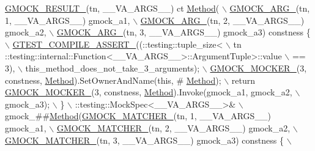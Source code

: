\begin{DoxyCode}
\hyperlink{gmock-generated-function-mockers_8h_a0e9d94e9c77df84f1103af06feee1077}{GMOCK\_RESULT\_}(tn, \_\_VA\_ARGS\_\_) ct \hyperlink{gmock-spec-builders__test_8cc_a95606368148f3e5aab5db46c32466afd}{Method}( \(\backslash\)
      \hyperlink{gmock-generated-function-mockers_8h_a887575cc1c31158fba808180a10c004f}{GMOCK\_ARG\_}(tn, 1, \_\_VA\_ARGS\_\_) gmock\_a1, \(\backslash\)
      \hyperlink{gmock-generated-function-mockers_8h_a887575cc1c31158fba808180a10c004f}{GMOCK\_ARG\_}(tn, 2, \_\_VA\_ARGS\_\_) gmock\_a2, \(\backslash\)
      \hyperlink{gmock-generated-function-mockers_8h_a887575cc1c31158fba808180a10c004f}{GMOCK\_ARG\_}(tn, 3, \_\_VA\_ARGS\_\_) gmock\_a3) constness \{ \hyperlink{gtest-port_8h_ae1f37dc71d5daa6fb49ca1b6047d4a8c}{\(\backslash\)}
\hyperlink{gtest-port_8h_ae1f37dc71d5daa6fb49ca1b6047d4a8c}{    GTEST\_COMPILE\_ASSERT\_}((::testing::tuple\_size<                          \(\backslash\)
        tn ::testing::internal::Function<\_\_VA\_ARGS\_\_>::ArgumentTuple>::value \(\backslash\)
            == 3), \(\backslash\)
        this\_method\_does\_not\_take\_3\_arguments); \hyperlink{gmock-generated-function-mockers_8h_a7d362499e27b1bc3a9806dd3cf58a5b7}{\(\backslash\)}
\hyperlink{gmock-generated-function-mockers_8h_a7d362499e27b1bc3a9806dd3cf58a5b7}{    GMOCK\_MOCKER\_}(3, constness, \hyperlink{gmock-spec-builders__test_8cc_a95606368148f3e5aab5db46c32466afd}{Method}).SetOwnerAndName(\textcolor{keyword}{this}, #
      \hyperlink{gmock-spec-builders__test_8cc_a95606368148f3e5aab5db46c32466afd}{Method}); \(\backslash\)
    return \hyperlink{gmock-generated-function-mockers_8h_a7d362499e27b1bc3a9806dd3cf58a5b7}{GMOCK\_MOCKER\_}(3, constness, \hyperlink{gmock-spec-builders__test_8cc_a95606368148f3e5aab5db46c32466afd}{Method}).Invoke(gmock\_a1, gmock\_a2, \(\backslash\)
        gmock\_a3); \(\backslash\)
  \} \(\backslash\)
  ::testing::MockSpec<\_\_VA\_ARGS\_\_>& \(\backslash\)
      gmock\_##\hyperlink{gmock-spec-builders__test_8cc_a95606368148f3e5aab5db46c32466afd}{Method}(\hyperlink{gmock-generated-function-mockers_8h_aa87d0009fe91f1c89d658776b55a769c}{GMOCK\_MATCHER\_}(tn, 1, \_\_VA\_ARGS\_\_) gmock\_a1, \(\backslash\)
                     \hyperlink{gmock-generated-function-mockers_8h_aa87d0009fe91f1c89d658776b55a769c}{GMOCK\_MATCHER\_}(tn, 2, \_\_VA\_ARGS\_\_) gmock\_a2, \(\backslash\)
                     \hyperlink{gmock-generated-function-mockers_8h_aa87d0009fe91f1c89d658776b55a769c}{GMOCK\_MATCHER\_}(tn, 3, \_\_VA\_ARGS\_\_) gmock\_a3) constness \{ 
      \hyperlink{gmock-generated-function-mockers_8h_a7d362499e27b1bc3a9806dd3cf58a5b7}{\(\backslash\)}

\end{DoxyCode}
